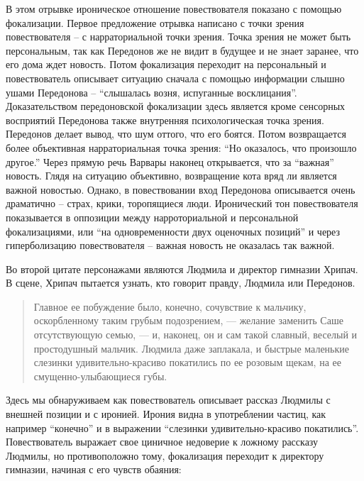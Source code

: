 \documentclass[12pt,a4paper]{article}
\begin{document}
В этом отрывке ироническое отношение повествователя показано с помощью фокализации. Первое предложение отрывка написано с точки зрения повествователя – с нарраториальной точки зрения. Точка зрения не может быть персональным, так как Передонов же не видит в будущее и не знает заранее, что его дома ждет новость. Потом фокализация переходит на персональный и повествователь описывает ситуацию сначала с помощью информации слышно ушами Передонова – \enquote{слышалась
возня, испуганные восклицания}. Доказательством передоновской фокализации здесь является кроме сенсорных восприятий Передонова также внутренняя психологическая точка зрения. Передонов делает вывод, что шум оттого, что его боятся. Потом возвращается более объективная нарраториальная точка зрения: \enquote{Но оказалось, что произошло другое.} Через прямую речь Варвары наконец открывается, что за \enquote{важная} новость.
Глядя на ситуацию объективно, возвращение кота вряд ли является  важной новостью. Однако, в повествовании вход Передонова описывается очень драматично – страх, крики, торопящиеся люди. Иронический тон повествователя показывается  в оппозиции между нарроториальной и персональной фокализациями, или \enquote{на одновременности двух оценочных позиций} и через гиперболизацию повествователя – важная новость не оказалась так важной.

Во второй цитате персонажами являются Людмила и директор гимназии Хрипач. В сцене, Хрипач пытается узнать, кто говорит правду, Людмила или Передонов.

\begin{quote}
Главное ее побуждение было,
конечно, сочувствие к мальчику, оскорбленному таким грубым
подозрением, — желание заменить Саше отсутствующую семью, — и,
наконец, он и сам такой славный, веселый и простодушный мальчик.
Людмила даже заплакала, и быстрые маленькие слезинки
удивительно-красиво покатились по ее розовым щекам, на ее смущенно-улыбающиеся
губы.

\parencite[239.]{sologub2004}
\end{quote}

Здесь мы обнаруживаем как повествователь описывает рассказ Людмилы с внешней позиции и с иронией. Ирония видна в употреблении частиц, как например \enquote{конечно} и в выражении \enquote{слезинки удивительно-красиво покатились}. Повествователь выражает свое циничное недоверие к ложному рассказу Людмилы, но противоположно тому, фокализация переходит к директору гимназии, начиная с его чувств обаяния:
\end{document}
